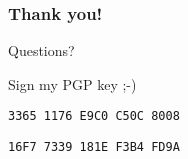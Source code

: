 \documentclass[xcolor={usenames,dvipsnames,svgnames}]{beamer}
\begin{document}







\begin{frame}[t,fragile]
   \frametitle{Thank you!}
\begin{center}
\Large
   Questions?

\vspace{1cm}
Sign my PGP key ;-)

\vspace{.5cm}
\verb|3365 1176 E9C0 C50C 8008|

\verb|16F7 7339 181E F3B4 FD9A|
\end{center}
\end{frame}
\end{document}
